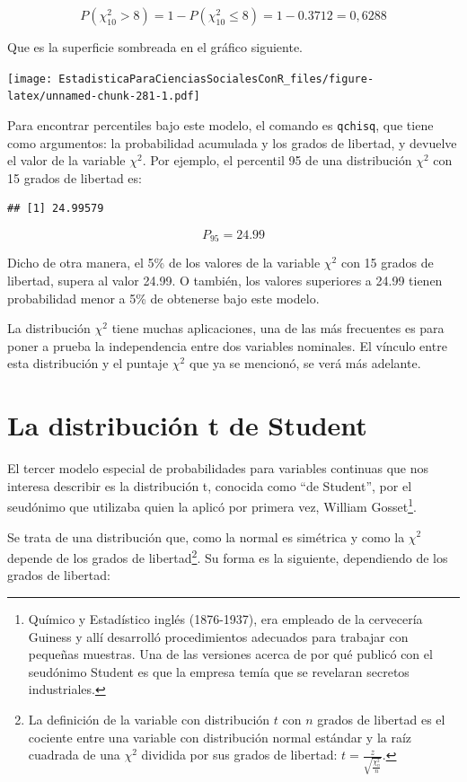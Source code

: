 \documentclass[]{book}
\let\rmarkdownfootnote\footnote%
\def\footnote{\protect\rmarkdownfootnote}
\begin{document}
\[P(\chi_{10}^{2} > 8) = 1-P(\chi_{10}^2 \leq 8)= 1-0.3712=0,6288\]

Que es la superficie sombreada en el gráfico siguiente.

\texttt{[image: EstadisticaParaCienciasSocialesConR\_files/figure-latex/unnamed-chunk-281-1.pdf]}

Para encontrar percentiles bajo este modelo, el comando es \texttt{qchisq}, que tiene como argumentos: la probabilidad acumulada y los grados de libertad, y devuelve el valor de la variable \(\chi^{2}\). Por ejemplo, el percentil 95 de una distribución \(\chi^{2}\) con 15 grados de libertad es:

\begin{verbatim}
## [1] 24.99579
\end{verbatim}

\[P_{95}=24.99\]

Dicho de otra manera, el 5\% de los valores de la variable \(\chi^{2}\) con 15 grados de libertad, supera al valor 24.99. O también, los valores superiores a 24.99 tienen probabilidad menor a 5\% de obtenerse bajo este modelo.

La distribución \(\chi^{2}\) tiene muchas aplicaciones, una de las más
frecuentes es para poner a prueba la independencia entre dos variables
nominales. El vínculo entre esta distribución y el puntaje \(\chi^{2}\)
que ya se mencionó, se verá más adelante.

\hypertarget{la-distribuciuxf3n-t-de-student}{%
\section{La distribución t de Student}\label{la-distribuciuxf3n-t-de-student}}

El tercer modelo especial de probabilidades para variables continuas que nos interesa describir es la distribución t, conocida como ``de Student'', por el seudónimo que utilizaba quien la aplicó por primera vez, William Gosset\footnote{Químico y Estadístico inglés (1876-1937), era empleado de la
  cervecería Guiness y allí desarrolló procedimientos adecuados para
  trabajar con pequeñas muestras. Una de las versiones acerca de por
  qué publicó con el seudónimo Student es que la empresa temía que se
  revelaran secretos industriales.}.

Se trata de una distribución que, como la normal es simétrica y como la
\(\chi^{2}\) depende de los grados de libertad\footnote{La definición de la variable con distribución \(t\) con \(n\) grados de
  libertad es el cociente entre una variable con distribución normal
  estándar y la raíz cuadrada de una \(\chi^{2}\) dividida por sus
  grados de libertad: \(t = \frac{z}{\sqrt{\frac{\chi_{n}^{2}}{n}}}\).}. Su forma es la
siguiente, dependiendo de los grados de libertad:
\end{document}
